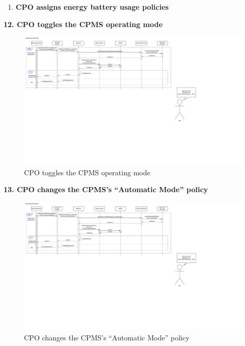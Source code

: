 \documentclass[11pt]{article}
\begin{document}
\begin{description}
\begin{enumerate}
\begin{description}
        \end{description}
        \item \textbf{CPO assigns energy battery usage policies}
    \end{enumerate}
    
    \newpage
    
    \item \textbf{12. CPO toggles the CPMS operating mode}
    \begin{figure}[!ht]
        \centering
        \includegraphics[page={12}, trim=0cm 16cm 28cm 1cmm, width=0.95\linewidth, clip]{RuntimeDiagrams.pdf}
        \caption{CPO toggles the CPMS operating mode}
    \end{figure}
    
    \item \textbf{13. CPO changes the CPMS’s “Automatic Mode” policy}
    \begin{figure}[!ht]
        \centering
        \includegraphics[page={13}, trim=0cm 15cm 27cm 1cmm, width=0.95\linewidth, clip]{RuntimeDiagrams.pdf}
        \caption{CPO changes the CPMS’s “Automatic Mode” policy}
    \end{figure}
\end{description}
\end{document}

